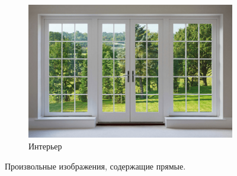 \documentclass[a4paper, 16pt]{article}
\begin{document}
\begin{figure}[htbp]
\begin{subfigure}{0.3\textwidth}
            \centering
            \includegraphics[width=\linewidth]{i3.png}
            \caption{Интерьер}
            \label{fig:i3}
        \end{subfigure}
        \caption{Произвольные изображения, содержащие прямые.}
        \label{fig:is}
    \end{figure}
\end{document}
